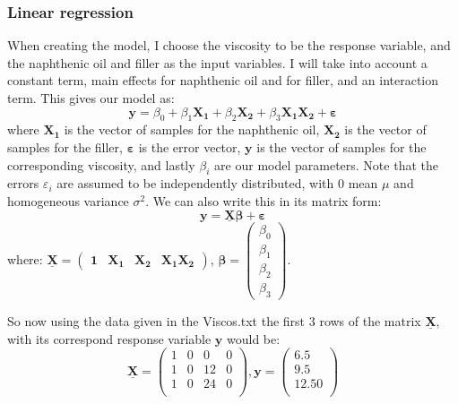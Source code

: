 \documentclass[12pt]{article}
\newcommand{\vect}[1]{\boldsymbol{#1}}
\newcommand{\mat}[1]{\underline{\boldsymbol{#1}}}
\begin{document}
\subsubsection{Linear regression}
When creating the model, I choose the viscosity to be the response variable, and the naphthenic oil and filler as the input variables. I will take into account a constant term, main eﬀects for naphthenic oil and for ﬁller, and an interaction term. This gives our model as:
\begin{equation} \label{lin_model}
\vect{y} = \beta_0 + \beta_1\vect{X_1} + \beta_2\vect{X_2} + \beta_3\vect{X_1}\vect{X_2} + \vect{\varepsilon}
\end{equation}
where $\vect{X_1}$ is the vector of samples for the naphthenic oil, $\vect{X_2}$ is the vector of samples for the filler, $\vect{\varepsilon}$ is the error vector, $\vect{y}$ is the vector of samples for the corresponding viscosity, and lastly $\beta_i$ are our model parameters. Note that the errors $\varepsilon_i$ are assumed to be independently distributed, with 0 mean $\mu$ and homogeneous variance $\sigma^2$.
We can also write this in its matrix form:
\begin{equation*}
\vect{y} = \mat{X}\vect{\beta} + \vect{\varepsilon}
\end{equation*}
where:
$\mat{X} = \begin{pmatrix}
              \vect{1} & \vect{X_1} & \vect{X_2} & \vect{X_1}\vect{X_2}
           \end{pmatrix}$,
$\vect{\beta} = \begin{pmatrix}
                  \beta_0 \\ \beta_1 \\ \beta_2 \\ \beta_3
                \end{pmatrix}$.\par
So now using the data given in the Viscos.txt the first 3 rows of the matrix $\mat{X}$, with its correspond response variable $\vect{y}$ would be:
\begin{equation*}
\mat{X} =
\begin{pmatrix}
  1   &   0   &   0   &   0   \\
  1   &   0   &   12  &   0   \\
  1   &   0   &   24  &   0   \\
\end{pmatrix},
\vect{y} =
\begin{pmatrix}
  6.5   \\
  9.5   \\
  12.50 \\
\end{pmatrix}
\end{equation*}
\end{document}
